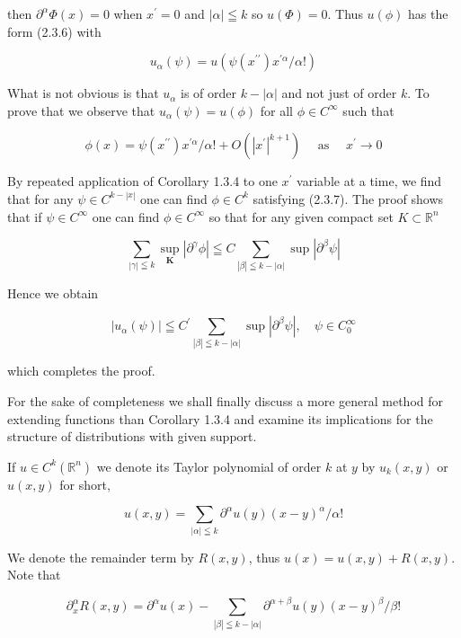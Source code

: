 then $\partial^{\alpha} \Phi(x)=0$ when $x^{\prime}=0$ and $|\alpha| \leqq k$ so $u(\Phi)=0$. Thus $u(\phi)$ has the form (2.3.6) with

\[
u_{\alpha}(\psi)=u\left(\psi\left(x^{\prime \prime}\right) x^{\prime \alpha} / \alpha !\right)
\]

What is not obvious is that $u_{\alpha}$ is of order $k-|\alpha|$ and not just of order $k$. To prove that we observe that $u_{\alpha}(\psi)=u(\phi)$ for all $\phi \in C^{\infty}$ such that


\begin{equation*}
\phi(x)=\psi\left(x^{\prime \prime}\right) x^{\prime \alpha} / \alpha !+O\left(\left|x^{\prime}\right|^{k+1}\right) \quad \text { as } \quad x^{\prime} \rightarrow 0 \tag{2.3.7}
\end{equation*}


By repeated application of Corollary 1.3.4 to one $x^{\prime}$ variable at a time, we find that for any $\psi \in C^{k-|x|}$ one can find $\phi \in C^{k}$ satisfying (2.3.7). The proof shows that if $\psi \in C^{\infty}$ one can find $\phi \in C^{\infty}$ so that for any given compact set $K \subset \mathbb{R}^{n}$

\[
\sum_{|\gamma| \leqq k} \sup _{\mathbf{K}}\left|\partial^{\gamma} \phi\right| \leqq C \sum_{|\beta| \leqq k-|\alpha|} \sup \left|\partial^{\beta} \psi\right|
\]

Hence we obtain

\[
\left|u_{\alpha}(\psi)\right| \leqq C^{\prime} \sum_{|\beta| \leqq k-|\alpha|} \sup \left|\partial^{\beta} \psi\right|, \quad \psi \in C_{0}^{\infty}
\]

which completes the proof.

For the sake of completeness we shall finally discuss a more general method for extending functions than Corollary 1.3.4 and examine its implications for the structure of distributions with given support.

If $u \in C^{k}\left(\mathbb{R}^{n}\right)$ we denote its Taylor polynomial of order $k$ at $y$ by $u_{k}(x, y)$ or $u(x, y)$ for short,

\[
u(x, y)=\sum_{|\alpha| \leqq k} \partial^{\alpha} u(y)(x-y)^{\alpha} / \alpha !
\]

We denote the remainder term by $R(x, y)$, thus $u(x)=u(x, y)+R(x, y)$. Note that

\[
\partial_{x}^{\alpha} R(x, y)=\partial^{\alpha} u(x)-\sum_{|\beta| \leqq k-|\alpha|} \partial^{\alpha+\beta} u(y)(x-y)^{\beta} / \beta !
\]

